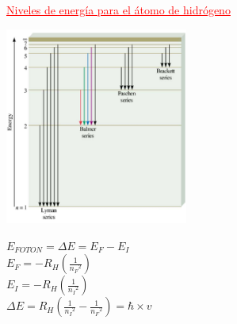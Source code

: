         \begin{center} \textcolor{red}{\underline{Niveles de energía para el átomo de hidrógeno}} \end{center}
            \begin{center} \includegraphics[width=6cm]{./imagenes/nivelesDeEnergia2.png} \end{center}

            \begin{center} 
                $E_{FOTON} = \Delta E = E_F - E_I$ \\[5pt]
                $E_F = - R_H (\frac{1}{{n_F}^{2}})$ \\[5pt]
                $E_I = -R_H (\frac{1}{{n_I}^{2}})$ \\[5pt]
                $\Delta E = R_H (\frac{1}{{n_I}^{2}} - \frac{1}{{n_F}^{2}}) = \hbar \times v$
            \end{center}


